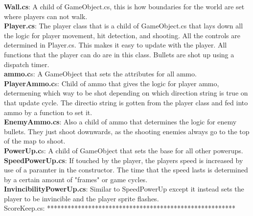 \documentclass[10pt,conference,onecolumn,compsoc]{IEEEtran}
\begin{document}
\textbf{Wall.cs}: A child of GameObject.cs, this is how boundaries for the world are set where players can not walk.\\
\textbf{Player.cs}: The player class that is a child of GameObject.cs that lays down all the logic for player movement, hit detection, and shooting.
All the controls are determined in Player.cs. This makes it easy to update with the player. All functions that the player can do are in 
this class. Bullets are shot up using a dispatch timer.\\
\textbf{ammo.c}s: A GameObject that sets the attributes for all ammo.\\
\textbf{PlayerAmmo.c}s: Child of ammo that gives the logic for player ammo, determening which way to be shot depending on which direction string is 
true on that update cycle. The directio string is gotten from the player class and fed into ammo by a function to set it.\\
\textbf{EnemyAmmo.cs}: Also a child of ammo that determines the logic for enemy bullets. They just shoot downwards, as the shooting enemies always
go to the top of the map to shoot.\\
\textbf{PowerUp.c}s: A child of GameObject that sets the base for all other powerups.\\
\textbf{SpeedPowerUp.cs}: If touched by the player, the players speed is increased by use of a paramter in the constructor. The time that the speed
lasts is determined by a certain amount of "frames" or game cycles.\\
\textbf{InvincibilityPowerUp.cs}: Similar to SpeedPowerUp except it instead sets the player to be invincible and the player sprite flashes.\\
ScoreKeep.cs: *******************************************************\\
\end{document}
